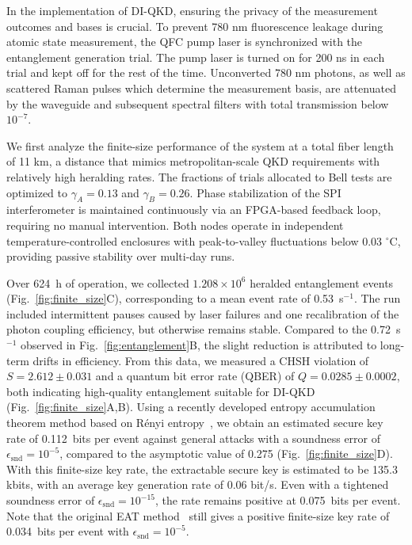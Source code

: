 \documentclass[aps,reprint,showpacs,superscriptaddress]{revtex4-2}
\newcommand{\degree}{^\circ}
\begin{document}
In the implementation of DI-QKD, ensuring the privacy of the measurement outcomes and bases is crucial. To prevent 780 nm fluorescence leakage during atomic state measurement, the QFC pump laser is synchronized with the entanglement generation trial. The pump laser is turned on for 200 ns in each trial and kept off for the rest of the time. Unconverted 780 nm photons, as well as scattered Raman pulses which determine the measurement basis, are attenuated by the waveguide and subsequent spectral filters with total transmission below $10^{-7}$.

We first analyze the finite-size performance of the system at a total fiber length of 11 km, a distance that mimics metropolitan-scale QKD requirements with relatively high heralding rates. The fractions of trials allocated to Bell tests are optimized to $\gamma_A = 0.13$ and $\gamma_B = 0.26$. Phase stabilization of the SPI interferometer is maintained continuously via an FPGA-based feedback loop, requiring no manual intervention. Both nodes operate in independent temperature-controlled enclosures with peak-to-valley fluctuations below 0.03 $\degree$C, providing passive stability over multi-day runs.

Over 624~h of operation, we collected $1.208\times10^6$ heralded entanglement events (Fig.~\ref{fig:finite_size}C), corresponding to a mean event rate of 0.53~s$^{-1}$. The run included intermittent pauses caused by laser failures and one recalibration of the photon coupling efficiency, but otherwise remains stable. Compared to the 0.72~s$^{-1}$ observed in Fig.~\ref{fig:entanglement}B, the slight reduction is attributed to long-term drifts in efficiency. From this data, we measured a CHSH violation of $S = 2.612 \pm 0.031$ and a quantum bit error rate (QBER) of $Q = 0.0285 \pm 0.0002$, both indicating high-quality entanglement suitable for DI-QKD (Fig.~\ref{fig:finite_size}A,B). Using a recently developed entropy accumulation theorem method based on R\'{e}nyi entropy~\cite{arq2024generalized}, we obtain an estimated secure key rate of 0.112~bits per event against general attacks with a soundness error of $\epsilon_{\mathrm{snd}} = 10^{-5}$, compared to the asymptotic value of 0.275 (Fig.~\ref{fig:finite_size}D). With this finite-size key rate, the extractable secure key is estimated to be 135.3 kbits, with an average key generation rate of 0.06 bit/s. Even with a tightened soundness error of $\epsilon_{\mathrm{snd}} = 10^{-15}$, the rate remains positive at 0.075~bits per event. Note that the original EAT method~\cite{arnon2018practical} still gives a positive finite-size key rate of 0.034~bits per event with $\epsilon_{\mathrm{snd}} = 10^{-5}$.
\end{document}
